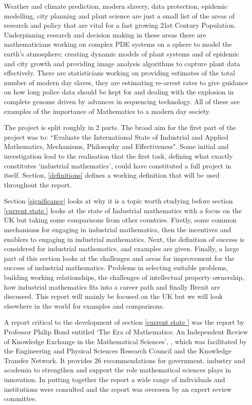 \documentclass[11pt]{article} %
\begin{document}
	
	Weather and climate prediction, modern slavery, data protection, epidemic modelling, city planning and  plant science are just a small list of the areas of research and policy that are vital for a fast growing 21st Century Population. Underpinning research and decision making in these areas there are mathematicians working on complex PDE systems on a sphere to model the earth's atmosphere; creating dynamic models of plant systems and of epidemic and city growth and  providing image analysis algorithms to capture plant data effectively. There are  statisticians working on providing estimates of the total number of modern day slaves, they are estimating re-arrest rates to give guidance on how long police data should be kept for and dealing with the explosion in complete genome driven by advances in sequencing technology. All of these are examples of the importance of Mathematics to a modern day society.
	 
	
	The project is split roughly in 2 parts. The broad aim for the first part of the project was to: ``Evaluate the  International State of Industrial and Applied Mathematics, Mechanisms, Philosophy and Effectiveness". Some initial and investigation lead to the realisation that the first task, defining what exactly constitutes `industrial mathematics', could have constituted a full project in itself.  Section, \ref{definitions} defines a working definition that will be used throughout the report. 
	
	Section \ref{significance} looks at why it is  a topic worth studying before section \ref{current state } looks at the state of Industrial mathematics with a focus on the UK but taking some comparisons from other countries.  Firstly, some common mechanisms for engaging in industrial mathematics, then the incentives and enablers to engaging in industrial mathematics. Next, the definition of success is considered for industrial mathematics, and examples are given. Finally, a large part of this section looks at the challenges and areas for improvement for the success of industrial mathematics. Problems in selecting suitable problems, building working relationships, the challenges of intellectual property ownership, how industrial mathematics fits into a career path and finally Brexit are discussed. This report will mainly be  focused on the UK but we will look elsewhere in the world for examples and comparisons. 
	
	
	 A report critical to the development of  section \ref{current state } was the report by Professor Philip Bond entitled `The Era of Mathematics: An Independent Review of Knowledge Exchange in the Mathematical Sciences', \cite{Bond}, which was facilitated by the Engineering and Physical Sciences Research Council and the Knowledge Transfer Network. It provides 26 recommendations for government, industry and academia to strengthen and support the role mathematical sciences plays in innovation. In putting together the report a wide range of individuals and institutions were consulted and the report was overseen by an expert review committee. 
	
\end{document}

